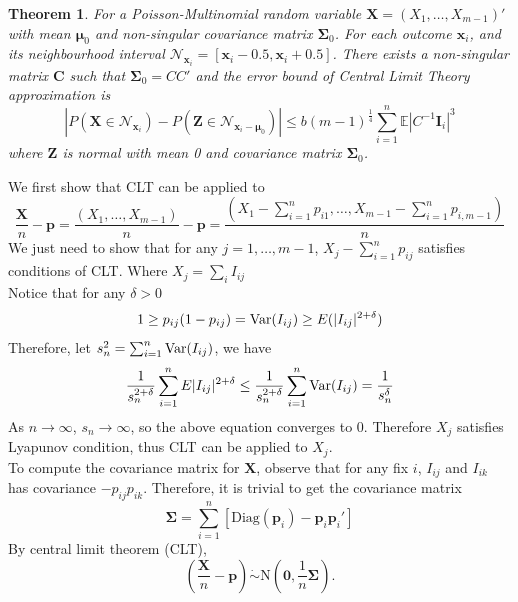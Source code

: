 \documentclass[12pt]{article}
\newcommand{\zerovec}{{\boldsymbol{0}}}
\newcommand{\EE}{\mathbb{E}}
\newcommand{\Xmat}{\mathbf{X}}
\newcommand{\pvec}{\boldsymbol{p}}
\newcommand{\Var}{{\rm Var}}
\newcommand{\N}{\textrm{N}}
\newcommand{\diag}{\textrm{Diag}}
\newtheorem{thm}{Theorem}
\begin{document}
\begin{thm}
For a Poisson-Multinomial random variable $\Xmat = (X_1,\dots,X_{m-1})'$ with mean $\boldsymbol{\mu}_0$ and non-singular covariance matrix $\boldsymbol{\Sigma}_0$. For each outcome $\boldsymbol{\boldsymbol{x}}_i$, and its neighbourhood interval $\mathcal{N}_{\boldsymbol{\boldsymbol{x}}_i} = [\boldsymbol{\boldsymbol{x}}_i-0.5,\boldsymbol{\boldsymbol{x}}_i+0.5]$. There exists a non-singular matrix $\boldsymbol{C}$ such that $\boldsymbol{\Sigma}_0 = CC'$ and the error bound of Central Limit Theory approximation is
\begin{equation*}
    |P(\Xmat \in \mathcal{N}_{\boldsymbol{x}_i}) - P(\boldsymbol{Z} \in \mathcal{N}_{\boldsymbol{x}_i-\boldsymbol{\mu}_0})| \leq b (m-1)^{\frac{1}{4}} \sum_{i=1}^{n}\EE|C^{-1}\boldsymbol{I}_{i}|^3
\end{equation*}
where $\boldsymbol{Z}$ is normal with mean 0 and covariance matrix $\boldsymbol{\Sigma}_0$.
\end{thm}
We first show that CLT can be applied to
\begin{equation*}
\frac{\Xmat}{n} - \pvec = \frac{(X_1,\dots,X_{m-1})}{n} - \pvec = \frac{(X_1 - \sum_{i=1}^{n}p_{i1},\dots,X_{m-1} - \sum_{i=1}^{n}p_{i,m-1})}{n}
\end{equation*}
We just need to show that for any $j = 1,\dots,m-1$, $X_j - \sum_{i=1}^{n}p_{ij}$ satisfies conditions of CLT. Where $X_{j} = \sum_i I_{ij}$ \\
Notice that for any $\delta > 0$
\begin{equation*}
    1\geq p_{ij}(1-p_{ij}) = \Var (I_{ij}) \geq E(|I_{ij}|^{2+ \delta})
\end{equation*}
Therefore, let $s_n^2 = \sum_{i=1}^{n}\Var(I_{ij})$, we have
\begin{equation*}
    \frac{1}{s_n^{2+\delta}}\sum_{i=1}^{n}E|I_{ij}|^{2 + \delta} \leq  \frac{1}{s_n^{2+\delta}}\sum_{i=1}^{n}\Var(I_{ij}) = \frac{1}{s_n^\delta}
\end{equation*}
As $n \rightarrow \infty$, $s_n \rightarrow \infty$, so the above equation converges to 0. Therefore $X_j$ satisfies Lyapunov condition, thus CLT can be applied to $X_j$.\\
To compute the covariance matrix for $\Xmat$,
observe that for any fix $i$, $I_{ij}$ and $I_{ik}$ has covariance $-p_{ij}p_{ik}$. Therefore, it is trivial to get the covariance matrix $$\boldsymbol{\Sigma}=\sum_{i=1}^n[\diag(\pvec_i)-\pvec_i\pvec_i']$$
By central limit theorem (CLT),
$$\left(\frac{\Xmat}{n}-\pvec\right)\dot\sim \N\left(\zerovec, \frac{1}{n}\boldsymbol{\Sigma}\right).$$\\
\end{document}

